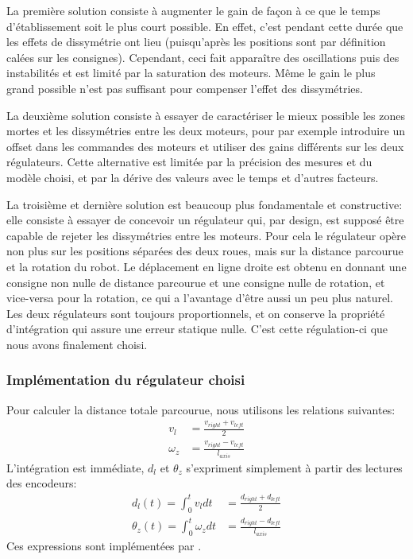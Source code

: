La première solution consiste à augmenter le gain de façon à ce que le temps d'établissement soit le plus court possible. En effet, c'est pendant cette durée que les effets de dissymétrie ont lieu (puisqu'après les positions sont par définition calées sur les consignes). Cependant, ceci fait apparaître des oscillations puis des instabilités et est limité par la saturation des moteurs. Même le gain le plus grand possible n'est pas suffisant pour compenser l'effet des dissymétries.

La deuxième solution consiste à essayer de caractériser le mieux possible les zones mortes et les dissymétries entre les deux moteurs, pour par exemple introduire un offset dans les commandes des moteurs et utiliser des gains différents sur les deux régulateurs. Cette alternative est limitée par la précision des mesures et du modèle choisi, et par la dérive des valeurs avec le temps et d'autres facteurs.

La troisième et dernière solution est beaucoup plus fondamentale et constructive: elle consiste à essayer de concevoir un régulateur qui, par design, est supposé être capable de rejeter les dissymétries entre les moteurs. Pour cela le régulateur opère non plus sur les positions séparées des deux roues, mais sur la distance parcourue et la rotation du robot. Le déplacement en ligne droite est obtenu en donnant une consigne non nulle de distance parcourue et une consigne nulle de rotation, et vice-versa pour la rotation, ce qui a l'avantage d'être aussi un peu plus naturel. Les deux régulateurs sont toujours proportionnels, et on conserve la propriété d'intégration qui assure une erreur statique nulle. C'est cette régulation-ci que nous avons finalement choisi.

\subsubsection{Implémentation du régulateur choisi}
Pour calculer la distance totale parcourue, nous utilisons les relations suivantes:
\begin{align*}
  v_l &= \frac{v_{right}+v_{left}}{2}\\
  \omega_z &= \frac{v_{right} - v_{left}}{l_{axis}}
\end{align*}
L'intégration est immédiate, $d_l$ et $\theta_z$ s'expriment simplement à partir des lectures des encodeurs:
\begin{align*}
  d_l(t) = \int_0^tv_l dt &= \frac{d_{right}+d_{left}}{2}\\
  \theta_z(t) = \int_0^t \omega_z dt &= \frac{d_{right} - d_{left}}{l_{axis}}
\end{align*}
Ces expressions sont implémentées par .

